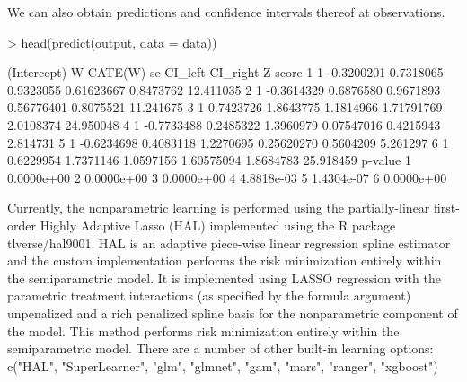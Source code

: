 \documentclass[article]{jss}
\begin{document}
We can also obtain predictions and confidence intervals thereof at observations.
\begin{Schunk}
\begin{Sinput}
> head(predict(output, data = data))
\end{Sinput}
\begin{Soutput}
  (Intercept)          W   CATE(W)        se    CI_left  CI_right   Z-score
1           1 -0.3200201 0.7318065 0.9323055 0.61623667 0.8473762 12.411035
2           1 -0.3614329 0.6876580 0.9671893 0.56776401 0.8075521 11.241675
3           1  0.7423726 1.8643775 1.1814966 1.71791769 2.0108374 24.950048
4           1 -0.7733488 0.2485322 1.3960979 0.07547016 0.4215943  2.814731
5           1 -0.6234698 0.4083118 1.2270695 0.25620270 0.5604209  5.261297
6           1  0.6229954 1.7371146 1.0597156 1.60575094 1.8684783 25.918459
     p-value
1 0.0000e+00
2 0.0000e+00
3 0.0000e+00
4 4.8818e-03
5 1.4304e-07
6 0.0000e+00
\end{Soutput}
\end{Schunk}

Currently, the nonparametric learning is performed using the partially-linear first-order Highly Adaptive Lasso (HAL) implemented using the R package tlverse/hal9001. HAL is an adaptive piece-wise linear regression spline estimator and the custom implementation performs the risk minimization entirely within the semiparametric model. It is implemented using LASSO regression with the parametric treatment interactions (as specified by the formula argument) unpenalized and a rich penalized spline basis for the nonparametric component of the model. This method performs risk minimization entirely within the semiparametric model. There are a number of other built-in learning options: c("HAL", "SuperLearner", "glm", "glmnet", "gam", "mars", "ranger", "xgboost")
\end{document}
